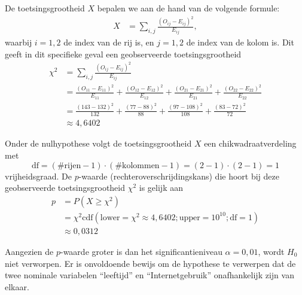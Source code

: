 \begin{enumerate}[label=(\alph*)]
{        De toetsingsgrootheid $X$ bepalen we aan de hand van de volgende formule:
        \begin{align*}
            X  &= \sum_{i,j} \frac{(O_{ij} - E_{ij})^2}{E_{ij}},
        \end{align*}
        waarbij $i = 1,2$ de index van de rij is, en $j = 1,2$ de index van de kolom is.
        Dit geeft in dit specifieke geval een geobserveerde toetsingsgrootheid 
        \begin{align*}
            \chi^2  &= \sum_{i,j} \frac{(O_{ij} - E_{ij})^2}{E_{ij}} \\
                    &=\frac{(O_{11} - E_{11})^2}{E_{11}} + \frac{(O_{12} - E_{12})^2}{E_{12}} + \frac{(O_{21} - E_{21})^2}{E_{21}} + \frac{(O_{22} - E_{22})^2}{E_{22}} \\
                    &= \frac{(143 - 132)^2}{132} + \frac{(77 - 88)^2}{88} + \frac{(97 - 108)^2}{108} + \frac{(83-72)^2}{72}\\
                    &\approx 4,6402
        \end{align*}

        Onder de nulhypothese volgt de toetsingsgrootheid $X$ een chikwadraatverdeling met
        \[
            \text{df} = (\#\text{rijen}-1) \cdot (\#\text{kolommen}-1) = (2-1)\cdot(2-1) = 1
        \]
        vrijheidsgraad.
        De $p$-waarde (rechteroverschrijdingskans) die hoort bij deze geobserveerde toetsingsgrootheid $\chi^2$ is gelijk aan
        \begin{align*}
            p   &= P(X \ge \chi^2) \\
                &= \chi^2\text{cdf}(\text{lower}=\chi^2\approx4,6402; \text{upper}=10^{10}; \text{df}=1) \\
                &\approx 0,0312
        \end{align*}

        Aangezien de $p$-waarde groter is dan het significantieniveau $\alpha=0,01$, wordt $H_0$ niet verworpen.
        Er is onvoldoende bewijs om de hypothese te verwerpen dat de twee nominale variabelen ``leeftijd'' en ``Internetgebruik'' onafhankelijk zijn van elkaar.
    }
\end{enumerate}